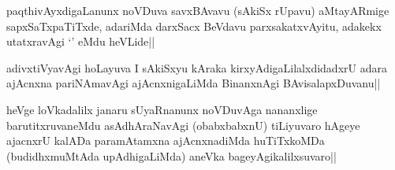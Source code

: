 \begin{artha}
paqthivAyxdigaLanunx noVDuva savxBAvavu (sAkiSx rUpavu) aMtayARmige sapxSaTxpaTiTxde, adariMda darxSacx BeVdavu parxsakatxvAyitu, adakekx utatxravAgi `\stext ' eMdu heVLide||
\end{artha}


\begin{artha}
adivxtiVyavAgi hoLayuva I sAkiSxyu kAraka kirxyAdigaLilalxdidadxrU adara ajAcnxna pariNAmavAgi ajAcnxnigaLiMda BinanxnAgi BAvisalapxDuvanu||
\end{artha}

\begin{artha}
heVge loVkadalilx janaru sUyaRnanunx noVDuvAga nananxlige barutitxruvaneMdu asAdhAraNavAgi (obabxbabxnU) tiLiyuvaro hAgeye ajacnxrU kalADa paramAtamxna ajAcnxnadiMda huTiTxkoMDa (budidhxmuMtAda upAdhigaLiMda) aneVka bageyAgikalilxsuvaro||
\end{artha}%

